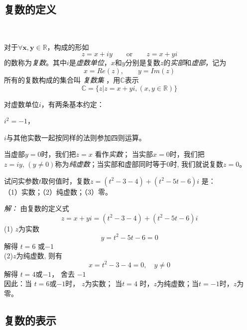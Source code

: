 \subsection{复数的定义}~\\
\begin{definition}\label{}\index{}
	对于$\forall \boldsymbol{x}, \boldsymbol{y} \in \mathbb{R} $，构成的形如
    \begin{equation}\label{eq:cn}
        z = x+iy \qquad\text{or}\qquad z = x+yi 
    \end{equation}
    的数称为\emph{复数}。其中$i$是\emph{虚数单位}，$x$和$y$分别是复数$z$的\emph{实部}和\emph{虚部}，记为 
    \begin{equation}\label{}
        x = Re(z), \qquad y = Im(z) 
    \end{equation}
    所有的复数构成的集合叫\emph{ 复数集  }，用$\mathbb{C}$表示
    \begin{equation}\label{}
        \mathbb{C} = \{ z| z= x+yi, (x,y \in \mathbb{R})\} 
    \end{equation}
\end{definition}
对虚数单位$i$，有两条基本约定：
\begin{compactitem}
  \item  $ i^2 = -1$，
  \item  $i$与其他实数一起按同样的法则参加四则运算。
\end{compactitem}

当虚部$y=0 $时，我们把$z = x$ 看作\emph{实数}； 当实部$x=0 $时，我们把$z = iy, \, (y \ne 0) $称为\emph{纯虚数}；当实部和虚部同时等于$0$时, 我们就说复数$z=0$。
\begin{example}
	试问实参数$t$取何值时，复数$z=(t^2 -3 -4) +(t^2 -5t -6)i$ 是：\\
    （1）实数；（2）纯虚数；（3）零。
\end{example}
\emph{解： } 由复数的定义式
\[ z= x +yi = (t^2 -3 -4) +(t^2 -5t -6)i\]
(1) $z$为实数
\[ y = t^2 -5t -6 =0 \]
解得 $t=6$ 或$ -1$ \\
(2)$z$为纯虚数, 
则有\[ x= t^2 -3 -4 =0, \quad  y \ne 0 \]
解得 $t =4$或$-1$， 舍去 $ -1$ \\
因此：当 $t =6$或$-1$时， $z$为实数； 当$t =4$ 时，$z$为纯虚数；当$t=-1$时，$z$为零。\\

\subsection{复数的表示}~\\

